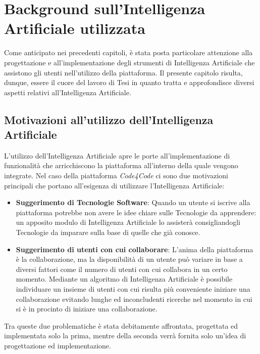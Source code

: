 \chapter{Background sull'Intelligenza Artificiale utilizzata} %
%

\begin{citazione}
Come anticipato nei precedenti capitoli, è stata posta particolare attenzione alla progettazione e all'implementazione degli strumenti di Intelligenza Artificiale che assistono gli utenti nell'utilizzo della piattaforma. Il presente capitolo risulta, dunque, essere il cuore del lavoro di Tesi in quanto tratta e approfondisce diversi aspetti relativi all'Intelligenza Artificiale. 
\end{citazione}
\newpage

\section{Motivazioni all'utilizzo dell'Intelligenza Artificiale} %
L'utilizzo dell'Intelligenza Artificiale apre le porte all'implementazione di funzionalità che arricchiscono la piattaforma all'interno della quale vengono integrate. Nel caso della piattaforma \emph{Code4Code} ci sono due motivazioni principali che portano all'esigenza di utilizzare l'Intelligenza Artificiale:
\begin{itemize}
    \item{\textbf{Suggerimento di Tecnologie Software}: Quando un utente si iscrive alla piattaforma potrebbe non avere le idee chiare sulle Tecnologie da apprendere: un apposito modulo di Intelligenza Artificiale lo assisterà consigliandogli Tecnologie da imparare sulla base di quelle che già conosce.}
    \item{\textbf{Suggerimento di utenti con cui collaborare}: L'anima della piattaforma è la collaborazione, ma la disponibilità di un utente può variare in base a diversi fattori come il numero di utenti con cui collabora in un certo momento. Mediante un algoritmo di Intelligenza Artificiale è possibile individuare un insieme di utenti con cui risulta più conveniente iniziare una collaborazione evitando lunghe ed inconcludenti ricerche nel momento in cui si è in procinto di iniziare una collaborazione.}
\end{itemize}
Tra queste due problematiche è stata debitamente affrontata, progettata ed implementata solo la prima, mentre della seconda verrà fornita solo un'idea di progettazione ed implementazione.
